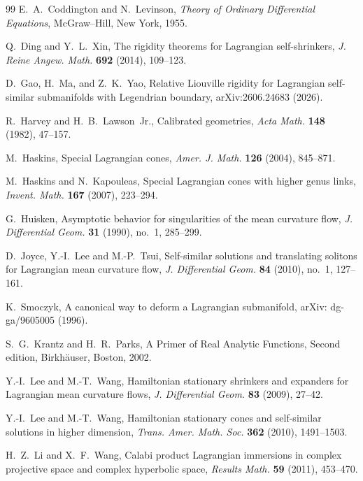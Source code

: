 \documentclass[11pt,a4paper]{article}
\numberwithin{equation}{section}
\begin{document}
\begin{thebibliography}{99}
E.~A.~Coddington and N.~Levinson,
\emph{Theory of Ordinary Differential Equations},
McGraw--Hill, New York, 1955.

Q.~Ding and Y.~L.~Xin, 
 The rigidity theorems for Lagrangian self-shrinkers,
 \emph{J. Reine Angew. Math.} \textbf{692} (2014), 109--123.

D.~Gao, H.~Ma, and Z.~K.~Yao,
Relative Liouville rigidity for Lagrangian
self-similar submanifolds with Legendrian boundary, arXiv:2606.24683 (2026).

R.~Harvey and H.~B.~Lawson~Jr.,
Calibrated geometries,
\emph{Acta Math.} \textbf{148} (1982), 47--157.

M.~Haskins,
Special Lagrangian cones,
\emph{Amer. J. Math.} \textbf{126} (2004), 845--871.

M.~Haskins and N.~Kapouleas,
Special Lagrangian cones with higher genus links,
\emph{Invent. Math.} \textbf{167} (2007), 223--294.

G.~Huisken, Asymptotic behavior for singularities of the mean curvature flow,  
\emph{J. Differential Geom.} \textbf{31} (1990), no.~1, 285--299.

D.~Joyce, Y.-I.~Lee and M.-P.~Tsui,
Self-similar solutions and translating solitons for Lagrangian mean curvature flow,
\emph{J. Differential Geom.} \textbf{84} (2010), no.~1, 127--161.

K.~Smoczyk, A canonical way to deform a Lagrangian submanifold,
arXiv: dg-ga/9605005 (1996).

S.~G.~Krantz and H.~R.~Parks,
A Primer of Real Analytic Functions, Second edition,
Birkh\"auser, Boston, 2002.


Y.-I.~Lee and M.-T.~Wang,
Hamiltonian stationary shrinkers and expanders for Lagrangian mean curvature flows,
\emph{J. Differential Geom.} \textbf{83} (2009), 27--42.

Y.-I.~Lee and M.-T.~Wang,
Hamiltonian stationary cones and self-similar solutions in higher dimension,
\emph{Trans. Amer. Math. Soc.} \textbf{362} (2010), 1491--1503.

H.~Z.~Li and X.~F.~Wang,
Calabi product Lagrangian immersions in complex projective space and complex hyperbolic space,
\emph{Results Math.} \textbf{59} (2011), 453--470.


\end{thebibliography}
\end{document}
